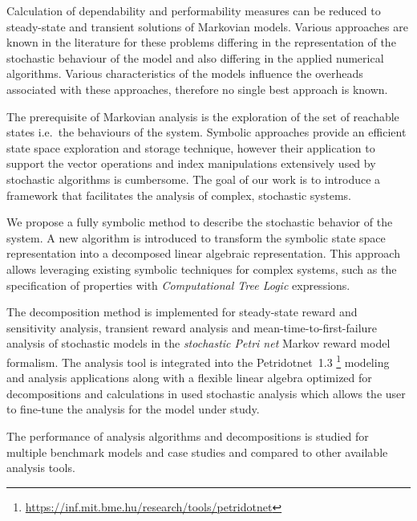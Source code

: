 Calculation of dependability and performability measures can be
reduced to steady-state and transient solutions of Markovian
models. Various approaches are known in the literature for these
problems differing in the representation of the stochastic behaviour
of the model and also differing in the applied numerical
algorithms. Various characteristics of the models influence the
overheads associated with these approaches, therefore no single best
approach is known.

The prerequisite of Markovian analysis is the exploration of the set
of reachable states i.e.~the behaviours of the system. Symbolic
approaches provide an efficient state space exploration and storage
technique, however their application to support the vector operations
and index manipulations extensively used by stochastic algorithms is
cumbersome.  The goal of our work is to introduce a framework that
facilitates the analysis of complex, stochastic systems.

We propose a fully symbolic method to describe the stochastic behavior
of the system. A new algorithm is introduced to transform the symbolic
state space representation into a decomposed linear algebraic
representation. This approach allows leveraging existing symbolic
techniques for complex systems, such as the specification of
properties with \emph{Computational Tree Logic} 
expressions.


The decomposition method is implemented for steady-state reward and
sensitivity analysis, transient reward analysis and
mean-time-to-first-failure analysis of stochastic models in the
\emph{stochastic Petri net}  Markov reward model
formalism. The analysis tool is integrated into the Petridotnet~1.3%
\footnote{\url{https://inf.mit.bme.hu/research/tools/petridotnet}}
modeling and analysis applications along with a flexible linear
algebra optimized for decompositions and calculations in used
stochastic analysis which allows the user to fine-tune the analysis
for the model under study.

The performance of analysis algorithms and decompositions is studied
for multiple benchmark models and case studies and compared to other
available analysis tools.
